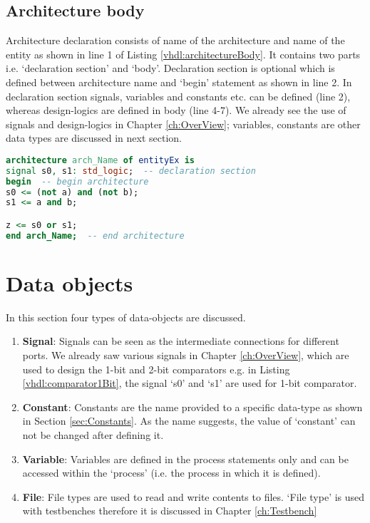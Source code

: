 \subsection{Architecture body}
Architecture declaration consists of name of the architecture and name of the entity as shown in line 1 of Listing \ref{vhdl:architectureBody}. It contains two parts i.e. `declaration section' and `body'. Declaration section is optional which is defined between architecture name and `begin' statement as shown in line 2. In declaration section signals, variables and constants etc. can be defined (line 2), whereas design-logics are defined in body (line 4-7). We already see the use of signals and design-logics in Chapter \ref{ch:OverView}; variables, constants are other data types are discussed in next section.

\begin{lstlisting}[language=Vhdl, caption=Architecture body, label= {vhdl:architectureBody}]
architecture arch_Name of entityEx is 
signal s0, s1: std_logic;  -- declaration section
begin  -- begin architecture
s0 <= (not a) and (not b);
s1 <= a and b;

z <= s0 or s1;
end arch_Name;  -- end architecture
\end{lstlisting}

\section{Data objects}
In this section four types of data-objects are discussed. 
\begin{enumerate}
	\item \textbf{Signal}: Signals can be seen as the intermediate connections for different ports. We already saw various signals in Chapter \ref{ch:OverView}, which are used to design the 1-bit and 2-bit comparators e.g. in Listing \ref{vhdl:comparator1Bit}, the signal `s0' and `s1' are used for 1-bit comparator. 
	
	\item \textbf{Constant}: Constants are the name provided to a specific data-type as shown in Section \ref{sec:Constants}. As the name suggests, the value of `constant' can not be changed after defining it. 
	
	\item \textbf{Variable}: Variables are defined in the process statements only and can be accessed within the `process' (i.e. the process in which it is defined).  
	
	\item \textbf{File}: File types are used to read and write contents to files. `File type' is used with testbenches therefore it is discussed in Chapter \ref{ch:Testbench}
\end{enumerate}

